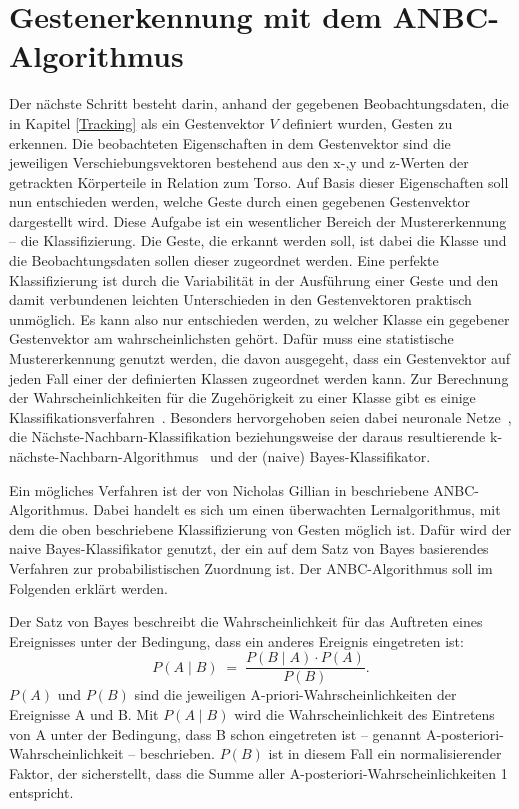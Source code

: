 \section{Gestenerkennung mit dem ANBC-Algorithmus}
Der nächste Schritt besteht darin, anhand der gegebenen Beobachtungsdaten, die in Kapitel \ref{Tracking} als ein Gestenvektor $V$ definiert wurden, Gesten zu erkennen. Die beobachteten Eigenschaften in dem Gestenvektor sind die jeweiligen Verschiebungsvektoren bestehend aus den x-,y und z-Werten der getrackten Körperteile in Relation zum Torso. Auf Basis dieser Eigenschaften soll nun entschieden werden, welche Geste durch einen gegebenen Gestenvektor dargestellt wird. Diese Aufgabe ist ein wesentlicher Bereich der Mustererkennung -- die Klassifizierung. Die Geste, die erkannt werden soll, ist dabei die Klasse und die Beobachtungsdaten sollen dieser zugeordnet werden. Eine perfekte Klassifizierung ist durch die Variabilität in der Ausführung einer Geste und den damit verbundenen leichten Unterschieden in den Gestenvektoren praktisch unmöglich. Es kann also nur entschieden werden, zu welcher Klasse ein gegebener Gestenvektor am wahrscheinlichsten gehört. Dafür muss eine statistische Mustererkennung genutzt werden, die davon ausgegeht, dass ein Gestenvektor auf jeden Fall einer der definierten Klassen zugeordnet werden kann. Zur Berechnung der Wahrscheinlichkeiten für die Zugehörigkeit zu einer Klasse gibt es einige Klassifikationsverfahren~\cite{patternClassification1}. Besonders hervorgehoben seien dabei neuronale Netze~\cite{patternClassification1}, die Nächste-Nachbarn-Klassifikation beziehungsweise der daraus resultierende k-nächste-Nachbarn-Algorithmus~\cite{nearestNeighbor} und der (naive) Bayes-Klassifikator.~\cite{patternRecognitionTheory}

Ein mögliches Verfahren ist der von Nicholas Gillian in \cite{gillianANBC} beschriebene ANBC-Algorithmus. Dabei handelt es sich um einen überwachten Lernalgorithmus, mit dem die oben beschriebene Klassifizierung von Gesten möglich ist. Dafür wird der naive Bayes-Klassifikator genutzt, der ein auf dem Satz von Bayes basierendes Verfahren zur probabilistischen Zuordnung ist. Der ANBC-Algorithmus soll im Folgenden erklärt werden.

Der Satz von Bayes beschreibt die Wahrscheinlichkeit für das Auftreten eines Ereignisses unter der Bedingung, dass ein anderes Ereignis eingetreten ist:
\begin{equation}
    P(A\mid B) \; = \; \frac {P(B\mid A) \cdot P(A)} {P(B)}.
\end{equation}
$P(A)$ und $P(B)$ sind die jeweiligen A-priori-Wahrscheinlichkeiten der Ereignisse A und B. Mit $P(A\mid B)$ wird die Wahrscheinlichkeit des Eintretens von A unter der Bedingung, dass B schon eingetreten ist -- genannt A-posteriori-Wahrscheinlichkeit -- beschrieben. $P(B)$ ist in diesem Fall ein normalisierender Faktor, der sicherstellt, dass die Summe aller A-posteriori-Wahrscheinlichkeiten 1 entspricht.

